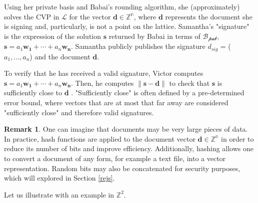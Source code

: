 \documentclass[11pt,reqno]{amsart}
\theoremstyle{definition}
\newtheorem{remark}[theorem]{Remark}
\begin{document}
Using her private basis and Babai's rounding algorithm, she (approximately) solves the CVP in $\mathcal{L}$ for the vector $\mathbf{d}\in \mathbb{Z^\text{n}}$, where $\mathbf{d}$ represents the document she is signing and, particularly, is not a point on the lattice. Samantha's "signature" is the expression of the solution $\mathbf{s}$ returned by Babai in terms of $\mathcal{B_\text{pub}}$, $\mathbf{s} = a_1\mathbf{w_1} + \cdots + a_n\mathbf{w_n}$. Samantha publicly publishes the signature $d_{sig}$ = ($a_1, ... , a_n$) and the document $\mathbf{d}$.

To verify that he has received a valid signature, Victor computes $\mathbf{s} = a_1\mathbf{w_1} + \cdots + a_n\mathbf{w_n}$. Then, he computes $ \| \mathbf{s} - \mathbf{d} \| $ to check that $\mathbf{s}$ is sufficiently close to $\mathbf{d}$ \cite[Chapter 7.12]{textbook}. "Sufficiently close" is often defined by a pre-determined error bound, where vectors that are at most that far away are considered "sufficiently close" and therefore valid signatures.


\begin{remark}
\label{rmk1}
    One can imagine that documents may be very large pieces of data. In practice, hash functions are applied to the document vector $\mathbf{d} \in \mathbb{Z^\text{n}}$ in order to reduce its number of bits and improve efficiency. Additionally, hashing allows one to convert a document of any form, for example a text file, into a vector representation. Random bits may also be concatenated for security purposes, which will explored in Section \ref{rejs}. 
\end{remark}

Let us illustrate with an example in $\mathbb{Z}^2$. 

\addtolength{\topmargin}{-1cm}
\end{document}
